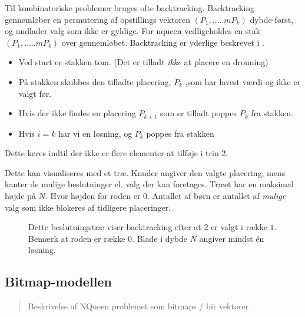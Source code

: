 \documentclass[pdf,draft,a4paper,10pt]{article}
\begin{document}
Til kombinatoriske problemer bruges ofte backtracking. Backtracking gennemløber en permutering af opstillings vektoren  $(P_1,\ldots..mP_k)$ dybde-først, og undlader valg som ikke er gyldige. For nqueen vedligeholdes en stak $(P_1,\ldots..mP_k)$ over gennemløbet. Backtracking er yderlige beskrevet i \cite{Golomb72}.

\begin{itemize}
\item Ved start er stakken tom. (Det er tilladt \textit{ikke} at placere en dronning)
\item På stakken skubbes den tilladte placering, $P_k$ ,som har lavest værdi og ikke er valgt før.
\item Hvis der ikke findes en placering $P_{k+1}$ som er tilladt poppes $P_k$ fra stakken. 
\item Hvis $i=k$ har vi en løsning, og $P_k$ poppes fra stakken
\end{itemize}
Dette køres indtil der ikke er flere elementer at tilføje i trin 2.

Dette kan visualiseres med et træ. Knuder angiver den valgte placering, mens kanter de mulige beslutninger el. valg der kan foretages.  Træet har en maksimal højde på $N$. Hvor højden for roden er 0. Antallet af børn er antallet af \textit{mulige} valg som ikke blokeres af tidligere placeringer. 

\begin{figure}[!h]

\caption{
Dette beslutningstræ viser backtracking efter at $2$ er valgt i række $1$.
Bemærk at roden er række 0. Blade i dybde $N$ angiver mindst én løsning.}
\label{fig:tree}
\end{figure}


\subsection{Bitmap-modellen}\label{bitmapmodellen}
\begin{verse}
	Beskrivelse af NQueen problemet som bitmaps / bit vektorer
\end{verse}
\end{document}
